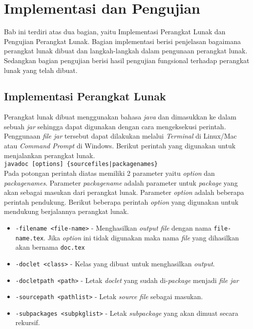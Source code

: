 \lstset{style=mystyle}
\chapter{Implementasi dan Pengujian}
\label{sec: Implementasi dan Pengujian}

Bab ini terdiri atas dua bagian, yaitu Implementasi Perangkat Lunak dan Pengujian Perangkat Lunak. Bagian implementasi berisi penjelasan bagaimana perangkat lunak dibuat dan langkah-langkah dalam pengunaan perangkat lunak. Sedangkan bagian pengujian berisi hasil pengujian fungsional terhadap perangkat lunak yang telah dibuat.
\section{Implementasi Perangkat Lunak}
\label{sec: Implementasi Perangkat Lunak}

Perangkat lunak dibuat menggunakan bahasa {\it java} dan dimasukkan ke dalam sebuah {\it jar} sehingga dapat digunakan dengan cara mengeksekusi perintah. Penggunaan {\it file jar} tersebut dapat dilakukan melalui {\it Terminal} di Linux/Mac atau {\it Command Prompt} di Windows. Berikut perintah yang digunakan untuk menjalankan perangkat lunak.
\\

{\tt javadoc [options] \{sourcefiles|packagenames\}}
\\

Pada potongan perintah diatas memiliki 2 parameter yaitu {\it option} dan {\it packagenames}. Parameter {\it packagename} adalah parameter untuk {\it package} yang akan sebagai masukan dari perangkat lunak. Parameter {\it option} adalah beberapa perintah pendukung. Berikut beberapa perintah {\it option} yang digunakan untuk mendukung berjalannya perangkat lunak.
\begin{itemize}
	\item {\tt -filename <file-name>} - Menghasilkan {\it output file} dengan nama {\tt file-name.tex}. Jika {\it option} ini tidak digunakan maka nama {\it file} yang dihasilkan akan bernama {\tt doc.tex}
	\item {\tt -doclet <class>} - Kelas yang dibuat untuk menghasilkan {\it output}.
	\item {\tt -docletpath <path>} - Letak {\it doclet} yang sudah di-{\it package} menjadi {\it file jar}
	\item {\tt -sourcepath <pathlist>} - Letak {\it source file} sebagai masukan.
	\item {\tt -subpackages <subpkglist>} - Letak {\it subpackage} yang akan dimuat secara rekursif.
\end{itemize}

